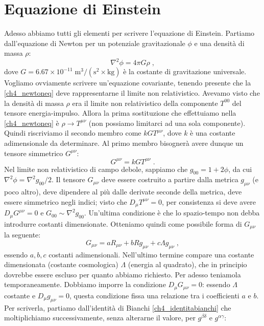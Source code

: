 \documentclass[12pt,a4paper]{report}
\theoremstyle{definition}
\begin{document}
\section{Equazione di Einstein}
Adesso abbiamo tutti gli elementi per scrivere l'equazione di Einstein. Partiamo dall'equazione di Newton per un potenziale gravitazionale $\phi$ e una densità di massa $\rho$:
\begin{equation}
\nabla^2\phi=4\pi G\rho\;, \label{ch4_newtoneq}
\end{equation}
dove $G=6.67\times 10^{-11}\; \mathrm{m}^3/(\mathrm{s}^2\times\mathrm{kg})$ è la costante di gravitazione universale. Vogliamo ovviamente scrivere un'equazione covariante, tenendo presente che la \eqref{ch4_newtoneq} deve rappresentarne il limite non relativistico. Avevamo visto che la densità di massa $\rho$ era il limite non relativistico della componente $T^{00}$ del tensore energia-impulso. Allora la prima sostituzione che effettuiamo nella \eqref{ch4_newtoneq} è $\rho\to T^{\mu\nu}$ (non possiamo limitarci ad una sola componente). Quindi riscriviamo il secondo membro come $kGT^{\mu\nu}$, dove $k$ è una costante adimensionale da determinare. Al primo membro bisognerà avere dunque un tensore simmetrico $G^{\mu\nu}$:
$$
G^{\mu\nu}=kGT^{\mu\nu}\;.
$$
Nel limite non relativistico di campo debole, sappiamo che $g_{00}=1+2\phi$, da cui $\nabla^2\phi=\nabla^2g_{00}/2$. Il tensore $G_{\mu\nu}$ deve essere costruito a partire dalla metrica $g_{\mu\nu}$ (e poco altro), deve dipendere al più dalle derivate seconde della metrica, deve essere simmetrico negli indici; visto che $D_{\mu}T^{\mu\nu}=0$, per consistenza si deve avere $D_{\mu}G^{\mu\nu}=0$ e $G_{00}\sim \nabla^2g_{00}$. Un'ultima condizione è che lo spazio-tempo non debba introdurre costanti dimensionate. Otteniamo quindi come possibile forma di $G_{\mu\nu}$ la seguente:
$$
G_{\mu\nu}=aR_{\mu\nu}+bRg_{\mu\nu}+c\Lambda g_{\mu\nu}\;,
$$
essendo $a,b,c$ costanti adimensionali. Nell'ultimo termine compare una costante dimensionata (costante cosmologica) $\Lambda$ (energia al quadrato), che in principio dovrebbe essere escluso per quanto abbiamo richiesto. Per adesso teniamola temporaneamente. Dobbiamo imporre la condizione $D_{\mu}G_{\mu\nu}=0$: essendo $\Lambda$ costante e $D_{\mu}g_{\mu\nu}=0$, questa condizione fissa una relazione tra i coefficienti $a$ e $b$. Per scriverla, partiamo dall'identità di Bianchi \eqref{ch4_identitabianchi} che moltiplichiamo successivamente, senza alterarne il valore, per $g^{\beta\delta}$ e $g^{\alpha\gamma}$:
\end{document}
